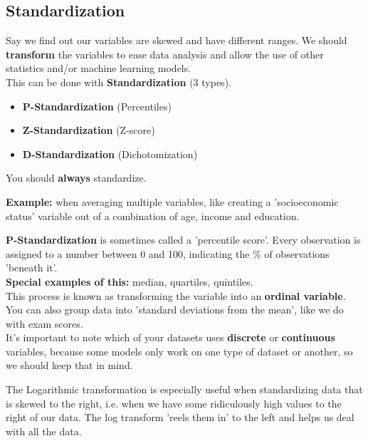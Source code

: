 \documentclass[english, 10pt]{article}
\begin{document}
\subsection{Standardization}

Say we find out our variables are skewed and have different ranges. We should \textbf{transform} the variables to ease data analysis and allow the use of other statistics and/or machine learning models.\\ 

This can be done with \textbf{Standardization} (3 types).

\begin{itemize}
	\item \textbf{P-Standardization} (Percentiles)
	\item \textbf{Z-Standardization} (Z-score)
	\item \textbf{D-Standardization} (Dichotomization)
\end{itemize}

You should \textbf{always} standardize. \\

\begin{myproof}
\textbf{Example:} when averaging multiple variables, like creating a 'socioeconomic status' variable out of a combination of age, income and education.
\end{myproof}

\hfill \break \textbf{P-Standardization} is sometimes called a 'percentile score'. Every observation is assigned to a number between 0 and 100, indicating the \% of observations 'beneath it'.\\

\textbf{Special examples of this:} median, quartiles, quintiles.\\

This process is known as transforming the variable into an \textbf{ordinal variable}.\\

You can also group data into 'standard deviations from the mean', like we do with exam scores.\\

It's important to note which of your datasets uses \textbf{discrete} or \textbf{continuous} variables, because some models only work on one type of dataset or another, so we should keep that in mind.\\

\begin{tcolorbox}[title=Aside: Logarithmic Transformation,colframe=black,colback=white,arc=0pt,fonttitle=\bfseries]
The Logarithmic transformation is especially useful when standardizing data that is skewed to the right, i.e. when we have some ridiculously high values to the right of our data. The log transform 'reels them in' to the left and helps us deal with all the data.
\end{tcolorbox}
\end{document}
